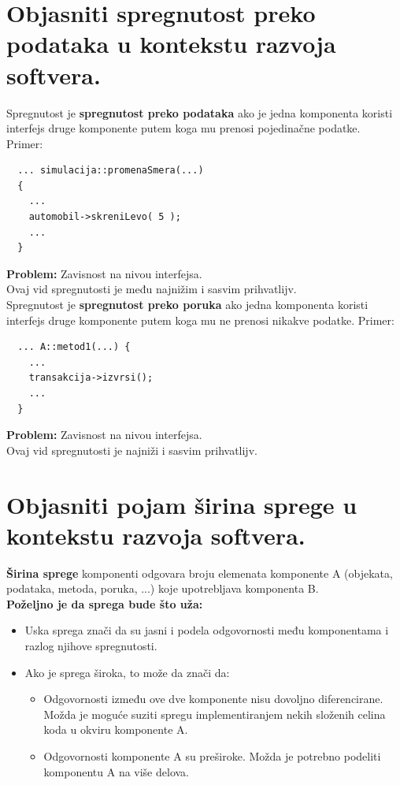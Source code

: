 \documentclass[a4paper]{article}
\begin{document}
\section{Objasniti spregnutost preko podataka u kontekstu razvoja softvera.}
  Spregnutost je \textbf{spregnutost preko podataka} ako je jedna komponenta koristi interfejs
  druge komponente putem koga mu prenosi pojedinačne podatke. \\
  Primer:
\begin{lstlisting}
  ... simulacija::promenaSmera(...)
  {
    ...
    automobil->skreniLevo( 5 );
    ...
  }\end{lstlisting}
  \textbf{Problem:} Zavisnost na nivou interfejsa.\\
  Ovaj vid spregnutosti je među najnižim i sasvim prihvatlijv.\\

  Spregnutost je \textbf{spregnutost preko poruka} ako jedna komponenta koristi interfejs
  druge komponente putem koga mu ne prenosi nikakve podatke. Primer:
\begin{lstlisting}
  ... A::metod1(...) {
    ...
    transakcija->izvrsi();
    ...
  }\end{lstlisting}
  \textbf{Problem:} Zavisnost na nivou interfejsa.\\
  Ovaj vid spregnutosti je najniži i sasvim prihvatlijv.\\

\section{Objasniti pojam širina sprege u kontekstu razvoja softvera.}
  \textbf{Širina sprege} komponenti odgovara broju elemenata komponente A (objekata, podataka,
  metoda, poruka, ...) koje upotrebljava komponenta B. \\
  \noindent \textbf{Poželjno je da sprega bude što uža:}
  \begin{itemize}
    \item Uska sprega znači da su jasni i podela odgovornosti među komponentama i razlog njihove
          spregnutosti.
    \item Ako je sprega široka, to može da znači da:
          \begin{itemize}
            \item Odgovornosti između ove dve komponente nisu dovoljno diferencirane. Možda je 
                  moguće suziti spregu implementiranjem nekih složenih celina koda u okviru
                  komponente A.
            \item Odgovornosti komponente A su preširoke. Možda je potrebno podeliti komponentu
                  A na više delova.
          \end{itemize} 
  \end{itemize}
\end{document}
